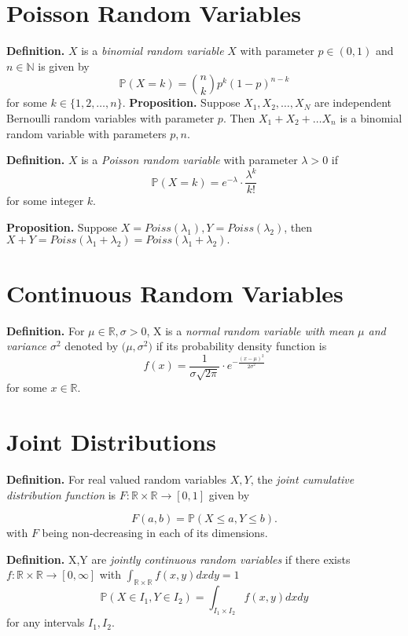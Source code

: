 \documentclass{article}[11pt]
\begin{document}
\section{Poisson Random Variables}

\textbf{Definition.} $X$ is a \emph{binomial random variable} $X$ with parameter $p \in (0,1)$ and $n \in \mathbb{N}$
is given by $$\mathbb{P}(X = k) = \binom{n}{k}p^k(1-p)^{n-k}$$ for some $k \in \{1,2,\dots, n\}.$
\textbf{Proposition.} Suppose $X_1, X_2, \dots, X_N$ are independent Bernoulli random
variables with parameter $p$. Then $X_1 + X_2 + \dots X_n$ is a binomial random variable with
parameters $p,n$.

\textbf{Definition.} $X$ is a \emph{Poisson random variable} with parameter $\lambda > 0$
if $$\mathbb{P}(X = k) = e^{-\lambda} \cdot \frac{\lambda^k}{k!}$$ for some integer $k$.

\textbf{Proposition.} Suppose $X = Poiss(\lambda_1), Y = Poiss(\lambda_2)$, then $X+Y = Poiss(\lambda_1 + \lambda_2) = Poiss(\lambda_1 + \lambda_2).$


\section{Continuous Random Variables}
\textbf{Definition. } For $\mu \in \mathbb{R}, \sigma > 0$, X is a \emph{normal random variable with mean $\mu$ and variance $\sigma^2$} denoted by
$\mathcal(\mu, \sigma^2)$ if its probability density function is
\[
  f(x) = \frac{1}{\sigma\sqrt{2\pi}} \cdot e^{-\frac{(x-\mu)^2}{2\sigma^2}}
\]
for some $x \in \mathbb{R}$.

\section{Joint Distributions}

\textbf{Definition.} For real valued random variables $X, Y$, the \emph{joint cumulative distribution function}
is $F: \mathbb{R} \times \mathbb{R} \to [0,1]$ given by

\[
F(a,b) = \mathbb{P}(X \leq a, Y \leq b).
\]
with $F$ being non-decreasing in each of its dimensions.

\textbf{Definition.} X,Y are \emph{jointly continuous random variables} if there exists 
\\ $f: \mathbb{R} \times \mathbb{R} \to [0, \infty]$
with $\int_{\mathbb{R}\times \mathbb{R}}f(x,y)dxdy = 1$
\[
  \mathbb{P}(X\in I_1, Y \in I_2)  = \int_{I_1 \times I_2} f(x,y)dxdy
\]
for any intervals $I_1, I_2$.
\end{document}
